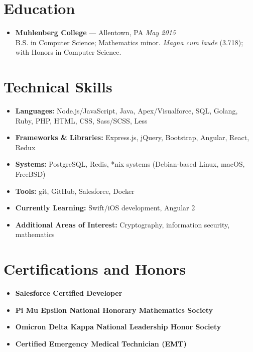 \documentclass[11pt]{article}
\begin{document}
\section*{Education}
\begin{itemize}
  \item \textbf{Muhlenberg College} --- Allentown, PA \hfill {\em May 2015} \\
  B.S. in Computer Science; Mathematics minor. {\em Magna cum laude} (3.718); with Honors in Computer Science.
\end{itemize}



\section*{Technical Skills}
\begin{itemize}
  \item \textbf{Languages:} Node.js/JavaScript, Java, Apex/Visualforce, SQL, Golang, Ruby, PHP, HTML, CSS, Sass/SCSS, Less
  \item \textbf{Frameworks \& Libraries:} Express.js, jQuery, Bootstrap, Angular, React, Redux
  \item \textbf{Systems:} PostgreSQL, Redis, *nix systems (Debian-based Linux, macOS, FreeBSD)
  \item \textbf{Tools:} git, GitHub, Salesforce, Docker
  \item \textbf{Currently Learning:} Swift/iOS development, Angular 2
  \item \textbf{Additional Areas of Interest:} Cryptography, information security, mathematics
\end{itemize}



\section*{Certifications and Honors}
\begin{itemize}
  \item \textbf{Salesforce Certified Developer}
  \item \textbf{Pi Mu Epsilon National Honorary Mathematics Society}
  \item \textbf{Omicron Delta Kappa National Leadership Honor Society}
  \item \textbf{Certified Emergency Medical Technician (EMT)}
\end{itemize}
\end{document}
